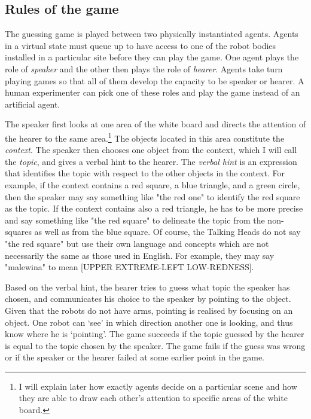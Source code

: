 \subsection{Rules of the game}

The guessing game is played between two 
physically instantiated agents. Agents in 
a virtual state must queue up to have access to one of the 
robot bodies installed in a particular site before
they can play the game. One agent 
plays the role of {\it speaker} and the other then plays the 
role of {\it hearer}. Agents take turn playing games 
so that all of them develop the capacity to be speaker or hearer.
A human experimenter can pick one of these roles and 
play the game instead of an artificial agent. 

The speaker first looks at one area of the white board and 
directs the attention of the hearer to the same area.\footnote{
I will explain later how exactly agents
decide on a particular scene and how they are able to 
draw each other's attention to specific areas of the 
white board.}
The objects located in this area constitute the {\it context}. 
The speaker then chooses one object from the context, which 
I will call the {\it topic}, and gives a verbal hint
to the hearer. The {\it verbal hint} is an expression
that identifies the topic 
with respect to the other objects in the context. For example, 
if the context contains a red square, a blue triangle, 
and a green circle, then the speaker may say something like 
"the red one" to identify the red square as the topic. 
If the context contains also a red triangle, he has to be more 
precise and say something like "the red square" to delineate
the topic from the non-squares as well as
from the blue square. 
Of course, the Talking Heads do not say "the red square"
but use their own language and concepts which are not 
necessarily the same as those used in English. For example, 
they may say "malewina" to mean [UPPER EXTREME-LEFT LOW-REDNESS]. 

Based on the verbal hint, the hearer tries to guess what
topic the speaker has chosen, and communicates his choice 
to the speaker by pointing to the object. Given that 
the robots do not have arms, pointing is realised by 
focusing on an object. One robot can `see' in which direction another one 
is looking, and thus know where he is `pointing'. 
The game succeeds if the topic guessed by the hearer is 
equal to the topic chosen by the speaker. 
The game fails if the guess was wrong or 
if the speaker or the hearer failed at some earlier point in the 
game. 

